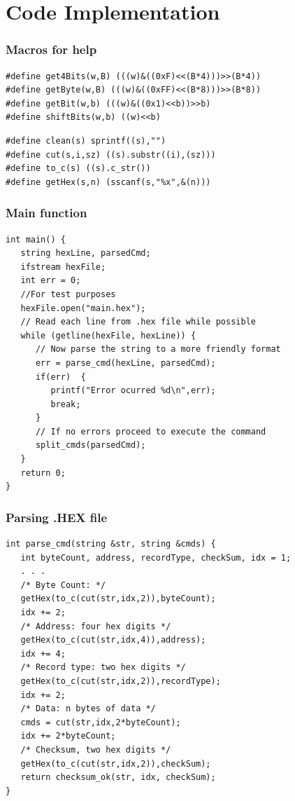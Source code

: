 \documentclass{beamer}
\begin{document}
\section{Code Implementation}
\begin{frame}[fragile]
\frametitle{ Macros for help }
\begin{example}
\begin{lstlisting}
#define get4Bits(w,B) (((w)&((0xF)<<(B*4)))>>(B*4))
#define getByte(w,B) (((w)&((0xFF)<<(B*8)))>>(B*8))
#define getBit(w,b) (((w)&((0x1)<<b))>>b)
#define shiftBits(w,b) ((w)<<b)
\end{lstlisting}
\end{example}
\begin{example}
\begin{lstlisting}
#define clean(s) sprintf((s),"")
#define cut(s,i,sz) ((s).substr((i),(sz)))
#define to_c(s) ((s).c_str())
#define getHex(s,n) (sscanf(s,"%x",&(n)))
\end{lstlisting}
\end{example}
\end{frame}
\begin{frame}[fragile]
\frametitle{ Main function }
\begin{example}
\begin{lstlisting}
int main() {
   string hexLine, parsedCmd;
   ifstream hexFile;
   int err = 0;	
   //For test purposes
   hexFile.open("main.hex");	
   // Read each line from .hex file while possible
   while (getline(hexFile, hexLine)) {
      // Now parse the string to a more friendly format
      err = parse_cmd(hexLine, parsedCmd);
      if(err)  {
         printf("Error ocurred %d\n",err);
         break; 
      }
      // If no errors proceed to execute the command	
      split_cmds(parsedCmd);
   }
   return 0;	
}
\end{lstlisting}
\end{example}
\end{frame}
\begin{frame}[fragile]
\frametitle{ Parsing .HEX file }
\begin{example}
\begin{lstlisting}
int parse_cmd(string &str, string &cmds) {
   int byteCount, address, recordType, checkSum, idx = 1;
   . . .
   /* Byte Count: */
   getHex(to_c(cut(str,idx,2)),byteCount);
   idx += 2;
   /* Address: four hex digits */
   getHex(to_c(cut(str,idx,4)),address);
   idx += 4;
   /* Record type: two hex digits */
   getHex(to_c(cut(str,idx,2)),recordType);
   idx += 2;
   /* Data: n bytes of data */
   cmds = cut(str,idx,2*byteCount);
   idx += 2*byteCount;
   /* Checksum, two hex digits */
   getHex(to_c(cut(str,idx,2)),checkSum);
   return checksum_ok(str, idx, checkSum);
}
\end{lstlisting}
\end{example}
\end{frame}
\end{document}
